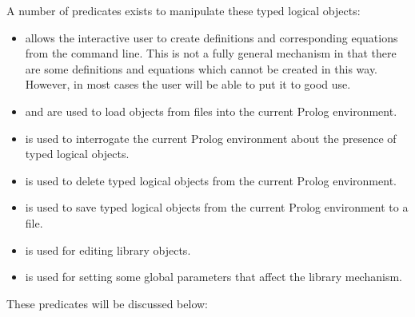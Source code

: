 A number of predicates exists to manipulate these typed logical
objects:
\begin{itemize}
\item 
{}  allows the interactive user to create definitions
and corresponding equations from the \clam{} command line.  This is not a
fully general mechanism in that there are some definitions and
equations which cannot be created in this way.  However, in most cases
the user will be able to put it to good use.
\item
{} and  are used to load objects from files into the
current Prolog environment.
\item
{} is used to interrogate the current Prolog
environment about the presence of typed logical objects.
\item
{} is used to delete typed logical objects from
the current Prolog environment.
\item
{} is used to save typed logical objects from
the current Prolog environment to a file.
\item
{} is used for editing library objects. 
\item
{} is used for setting some global parameters that
affect the library mechanism.
\end{itemize}

These predicates will be discussed below:


